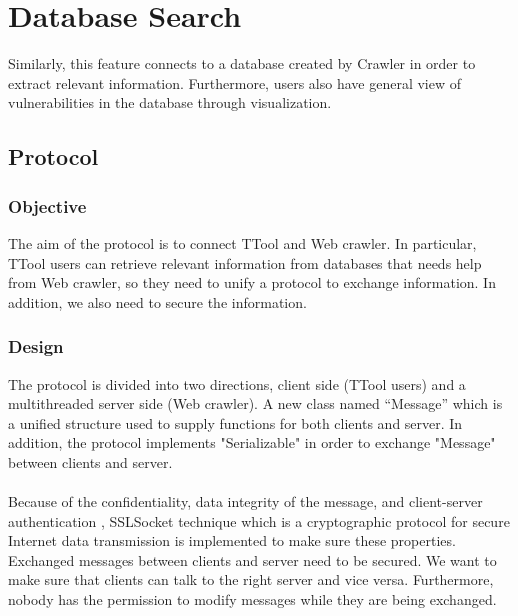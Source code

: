 \documentclass[a4paper,12pt,oneside]{report}
\begin{document}
		\section{Database Search}
		Similarly, this feature connects to a database created by Crawler in order to extract relevant information. Furthermore, users also have general view of vulnerabilities in the database through visualization. 
		
\subsection{Protocol}
	\subsubsection{Objective}
	The aim of the protocol is to connect TTool and Web crawler. In particular, TTool users can retrieve relevant information from databases that needs help from Web crawler, so they need to unify a protocol to exchange information. In addition, we also need to secure the information. 
	
	\subsubsection{Design}
	The protocol is divided into two directions, client side (TTool users) and a multithreaded server side (Web crawler). A new class named “Message” which is a unified structure used to supply functions for both clients and server. In addition, the protocol implements "Serializable" in order to exchange "Message" between clients and server.\\\\
	Because of the confidentiality, data integrity of the message, and client-server authentication , SSLSocket technique which is a cryptographic protocol for secure Internet data transmission is implemented to make sure these properties. Exchanged messages between clients and server need to be secured. We want to make sure that clients can talk to the right server and vice versa. Furthermore, nobody has the permission to modify messages while they are being exchanged.
	
\end{document}
